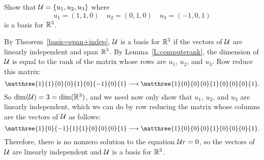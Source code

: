 \documentclass{article}
\begin{document}
\problemlabel

\begin{exercise} \label{c5.5.1}
Show that ${\cal U}=\{u_1,u_2,u_3\}$ where
\[
u_1=(1,1,0) \quad u_2=(0,1,0) \quad u_3=(-1,0,1)
\]
is a basis for $\mathbb R^3$.

\begin{solution}

By Theorem~\ref{basis=span+indep},
${\cal U}$ is a basis for $\mathbb R^3$ if the vectors of ${\cal U}$ are
linearly independent and span $\mathbb R^3$.  By Lemma~\ref{L:computerank},
the dimension of ${\cal U}$ is equal to the rank of the matrix whose
rows are $u_1$, $u_2$, and $u_3$.  Row reduce this matrix:
\[
\matthree{1}{1}{0}{0}{1}{0}{-1}{0}{1} \longrightarrow
\matthree{1}{0}{0}{0}{1}{0}{0}{0}{1}.
\]
So $\dim({\cal U}) = 3 = \dim(\mathbb R^3)$, and we need now only show that
$u_1$, $u_2$, and $u_3$ are linearly independent, which we can do by
row reducing the matrix whose columns are the vectors of ${\cal U}$ as
follows:
\[
\matthree{1}{0}{-1}{1}{1}{0}{0}{0}{1} \longrightarrow
\matthree{1}{0}{0}{0}{1}{0}{0}{0}{1}.
\]
Therefore, there is no nonzero solution to the equation
${\cal U}r = 0$, so the vectors of ${\cal U}$ are linearly independent
and ${\cal U}$ is a basis for $\mathbb R^3$.

\end{solution}
\end{exercise}


\end{document}
